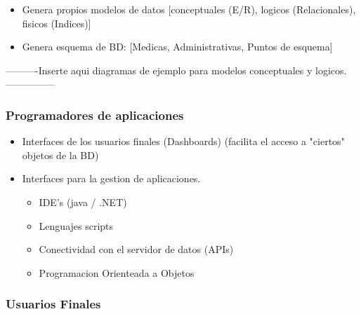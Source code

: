 \documentclass[twoside]{article}
\begin{document}
\begin{itemize}
  \item Genera propios modelos de datos [conceptuales (E/R), logicos (Relacionales), fisicos (Indices)]
  \item Genera esquema de BD: [Medicas, Administrativas, Puntos de esquema]
\end{itemize}

----------Inserte aqui diagramas de ejemplo para modelos conceptuales y logicos.---------------

\subsubsection{Programadores de aplicaciones}

\begin{itemize}
  \item Interfaces de los usuarios finales (Dashboards) (facilita el acceso a "ciertos" objetos de la BD)
  \item Interfaces para la gestion de aplicaciones.
  \begin{itemize}
    \item IDE's (java / .NET)
    \item Lenguajes scripts
    \item Conectividad con el servidor de datos (APIs)
    \item Programacion Orienteada a Objetos
  \end{itemize}
\end{itemize}

\subsubsection{Usuarios Finales}
\end{document}
